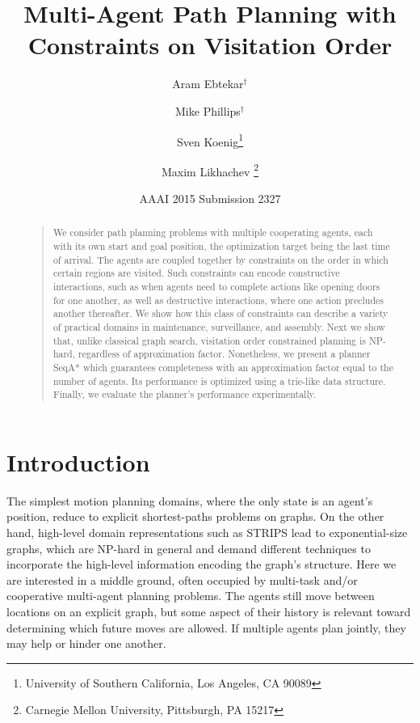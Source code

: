 \documentclass[letterpaper]{article}
\begin{document}
%
\title{Multi-Agent Path Planning with Constraints on Visitation Order}
\author{Aram Ebtekar$^\dagger$ \and Mike Phillips$^\dagger$ \and Sven Koenig\thanks{University of Southern California, Los Angeles, CA 90089} \and Maxim Likhachev%
\thanks{Carnegie Mellon University, Pittsburgh, PA 15217}%
%
}
\author{AAAI 2015 Submission 2327}%
\maketitle
\begin{abstract}
\begin{quote}
We consider path planning problems with multiple cooperating agents, each with its own start and goal position, the optimization target being the last time of arrival. The agents are coupled together by constraints on the order in which certain regions are visited. Such constraints can encode constructive interactions, such as when agents need to complete actions like opening doors for one another, as well as destructive interactions, where one action precludes another thereafter. We show how this class of constraints can describe a variety of practical domains in maintenance, surveillance, and assembly. Next we show that, unlike classical graph search, visitation order constrained planning is NP-hard, regardless of approximation factor. Nonetheless, we present a planner SeqA* which guarantees completeness with an approximation factor equal to the number of agents. Its performance is optimized using a trie-like data structure. Finally, we evaluate the planner's performance experimentally.
\end{quote}
\end{abstract}

\section{Introduction}

The simplest motion planning domains, where the only state is an agent's position, reduce to explicit shortest-paths problems on graphs. On the other hand, high-level domain representations such as STRIPS lead to exponential-size graphs, which are NP-hard in general and demand different techniques to incorporate the high-level information encoding the graph's structure. Here we are interested in a middle ground, often occupied by multi-task and/or cooperative multi-agent planning problems. The agents still move between locations on an explicit graph, but some aspect of their history is relevant toward determining which future moves are allowed. If multiple agents plan jointly, they may help or hinder one another.
\end{document}
